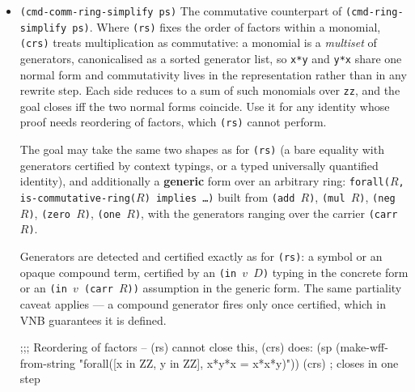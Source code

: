 \begin{itemize}
\begin{VNBcode}
;;; After (di), a compound term certified in context becomes a generator:
(sp (make-wff-from-string
  "forall([x in ZZ], (f(x) in ZZ) implies 3 + f(x) = 1 + f(x) + 2)"))
(di) (di) (rs)    ; di peels the forall then the hypothesis; rs then closes

;;; Coefficient arithmetic:
(sp (make-wff-from-string "forall([x in ZZ], 2*x + 3*x = 5*x)"))
(rs)
  \end{VNBcode}

  The primitive inference is \texttt{pi-ring-simplify!}, in
  \texttt{structure-library/ring-simplify.scm}; it normalizes each side to a
  canonical sum-of-monomials polynomial (\texttt{vnb->poly}) and compares.  The interactive short form is \texttt{(rs)}.

\item \texttt{(cmd-comm-ring-simplify ps)}
  The commutative counterpart of \texttt{(cmd-ring-simplify ps)}.  Where
  \texttt{(rs)} fixes the order of factors within a monomial,
  \texttt{(crs)} treats multiplication as commutative: a monomial is a
  \emph{multiset} of generators, canonicalised as a sorted generator
  list, so \texttt{x*y} and \texttt{y*x} share one normal form and
  commutativity lives in the representation rather than in any rewrite
  step.  Each side reduces to a sum of such monomials over \texttt{zz},
  and the goal closes iff the two normal forms coincide.  Use it for any
  identity whose proof needs reordering of factors, which \texttt{(rs)}
  cannot perform.

  The goal may take the same two shapes as for \texttt{(rs)} (a bare
  equality with generators certified by context typings, or a typed
  universally quantified identity), and additionally a \textbf{generic}
  form over an arbitrary ring: \texttt{forall($R$, is-commutative-ring($R$)
  implies \ldots)} built from \texttt{(add $R$)}, \texttt{(mul $R$)},
  \texttt{(neg $R$)}, \texttt{(zero $R$)}, \texttt{(one $R$)}, with the
  generators ranging over the carrier \texttt{(carr $R$)}.

  Generators are detected and certified exactly as for \texttt{(rs)}: a
  symbol or an opaque compound term, certified by an \texttt{(in $v$ $D$)}
  typing in the concrete form or an \texttt{(in $v$ (carr $R$))} assumption in
  the generic form.  The same partiality caveat applies --- a compound
  generator fires only once certified, which in VNB guarantees it is
  defined.

  \begin{VNBcode}
;;; Reordering of factors -- (rs) cannot close this, (crs) does:
(sp (make-wff-from-string
  "forall([x in ZZ, y in ZZ], x*y*x = x*x*y)"))
(crs)   ; closes in one step


\end{VNBcode}
\end{itemize}
